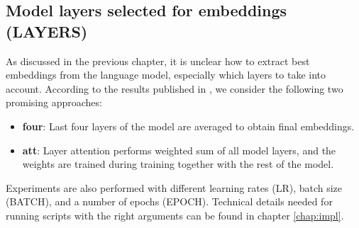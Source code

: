 \subsection{Model layers selected for embeddings (LAYERS)}
As discussed in the previous chapter, it is unclear how to extract best embeddings from the language model, especially which layers to take into account. According to the results published in \citep{Devlin2019, Kondratyuk2019}, we consider the following two promising approaches:
\begin{itemize}
\item \textbf{four}: Last four layers of the model are averaged to obtain final embeddings.
\item \textbf{att}: Layer attention performs weighted sum of all model layers, and the weights are trained during training together with the rest of the model.
\end{itemize}
Experiments are also performed with different learning rates (LR), batch size (BATCH), and a number of epochs (EPOCH). 
Technical details needed for running scripts with the right arguments can be found in chapter \ref{chap:impl}.

